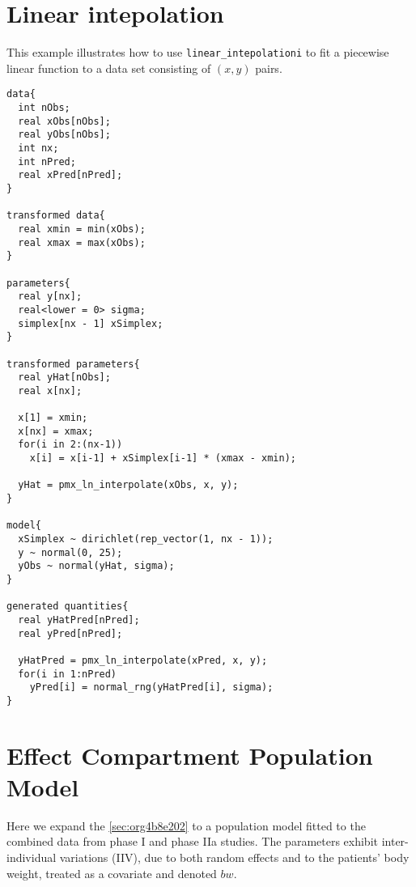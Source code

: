 \documentclass[12pt, reqno, oneside]{amsbook}
\numberwithin{equation}{chapter}
\numberwithin{figure}{chapter}
\numberwithin{table}{chapter}
\theoremstyle{remark}
\begin{document}
\section{Linear intepolation}
\label{sec:orgb89dc56}
This example illustrates how to use \texttt{linear\_intepolationi}
to fit a piecewise linear function to a data set consisting
of \((x, y)\) pairs.
\begin{verbatim}
data{
  int nObs;
  real xObs[nObs];
  real yObs[nObs];
  int nx;
  int nPred;
  real xPred[nPred];
}

transformed data{
  real xmin = min(xObs);
  real xmax = max(xObs);
}

parameters{
  real y[nx];
  real<lower = 0> sigma;
  simplex[nx - 1] xSimplex;
}

transformed parameters{
  real yHat[nObs];
  real x[nx];

  x[1] = xmin;
  x[nx] = xmax;
  for(i in 2:(nx-1))
    x[i] = x[i-1] + xSimplex[i-1] * (xmax - xmin);

  yHat = pmx_ln_interpolate(xObs, x, y);
}

model{
  xSimplex ~ dirichlet(rep_vector(1, nx - 1));
  y ~ normal(0, 25);
  yObs ~ normal(yHat, sigma);
}

generated quantities{
  real yHatPred[nPred];
  real yPred[nPred];

  yHatPred = pmx_ln_interpolate(xPred, x, y);
  for(i in 1:nPred)
    yPred[i] = normal_rng(yHatPred[i], sigma);
}
\end{verbatim}

\section{Effect Compartment Population Model}
\label{sec:org3aea8e7}
Here we expand the \ref{sec:org4b8e202} to a population model fitted to the
combined data from phase I and phase IIa studies. The
parameters exhibit inter-individual variations (IIV), due to
both random effects and to the patients' body weight,
treated as a covariate and denoted \(bw\).
\end{document}
